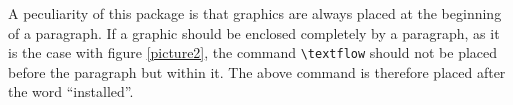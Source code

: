 A peculiarity of this package is that graphics are always placed at the beginning of a paragraph.
If a graphic should be enclosed completely by a paragraph, as it is the case with figure \ref{picture2}, the command 
\texttt{\textbackslash textflow} should not be placed before the paragraph but within it.
The above command is therefore placed after the word "`installed"'.
%